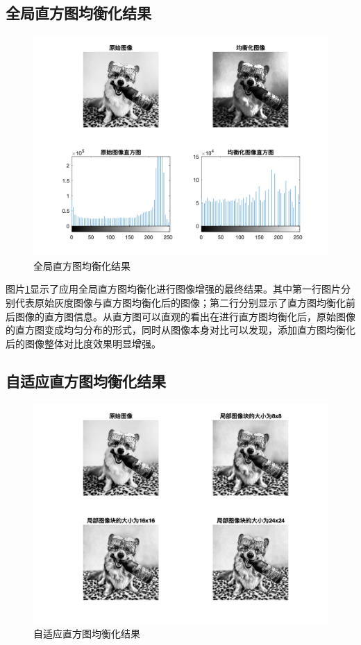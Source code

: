 \documentclass[conference]{IEEEtran}
\begin{document}
\subsection{全局直方图均衡化结果}
\begin{figure}[htbp]
	\centerline{
		\includegraphics[width=13cm]{q1_1.png} 	
	}
	\caption{全局直方图均衡化结果}
	\label{pic1}
\end{figure}

图片\ref{pic1}显示了应用全局直方图均衡化进行图像增强的最终结果。其中第一行图片分别代表原始灰度图像与直方图均衡化后的图像；第二行分别显示了直方图均衡化前后图像的直方图信息。从直方图可以直观的看出在进行直方图均衡化后，原始图像的直方图变成均匀分布的形式，同时从图像本身对比可以发现，添加直方图均衡化后的图像整体对比度效果明显增强。

\subsection{自适应直方图均衡化结果}
\begin{figure}[htbp]
	\centerline{
		\includegraphics[width=13cm]{q1_2.png} 	
	}
	\caption{自适应直方图均衡化结果}
	\label{pic2}
\end{figure}
\end{document}

